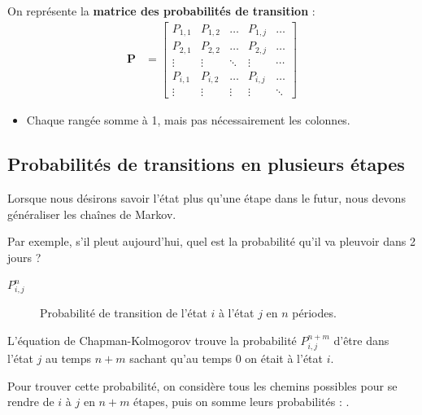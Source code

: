 \documentclass[french]{article}
\begin{document}
\begin{multicols*}{2}
On représente la \textbf{matrice des probabilités de transition}  : 
\begin{align*}
	\bm{P}
	&=	\begin{bmatrix}
		P_{1, 1}	&	P_{1, 2}	&	\dots	&	P_{1, j}		&	\dots	\\
		P_{2, 1}	&	P_{2, 2}	&	\dots	&	P_{2, j}		&	\dots	\\
		\vdots	&	\vdots	&	\ddots	&	\vdots		&	\cdots	\\
		P_{i, 1}	&	P_{i, 2}	&	\dots	&	P_{i, j}		&	\dots	\\
		\vdots	&	\vdots	&	\vdots	&	\vdots		&	\ddots	
		\end{bmatrix}
\end{align*}
\begin{itemize}
	\item	Chaque rangée somme à 1, mais pas nécessairement les colonnes.
\end{itemize}


\columnbreak
\subsection{Probabilités de transitions en plusieurs étapes}
\begin{rappel_enhanced}[Contexte]
Lorsque nous désirons savoir l'état plus qu'une étape dans le futur, nous devons généraliser les chaînes de Markov. 

\bigskip

Par exemple, s'il pleut aujourd'hui, quel est la probabilité qu'il va pleuvoir dans 2 jours ? 
\end{rappel_enhanced}

\begin{distributions}[Notation]
\begin{description}
	\item[$P_{i, j}^{n}$]	Probabilité de transition de l'état $i$ à l'état $j$ en $n$ périodes.
\end{description}
\end{distributions}

\begin{definitionNOHFILLprop}
L'équation de Chapman-Kolmogorov trouve la probabilité $P_{i, j}^{n + m}$ d'être dans l'état $j$ au temps $n + m$ sachant qu'au temps $0$ on était à l'état $i$.	

\bigskip

Pour trouver cette probabilité, on considère tous les chemins possibles pour se rendre de $i$ à $j$ en $n + m$ étapes, puis on somme leurs probabilités : .	


\end{definitionNOHFILLprop}
\end{multicols*}
\end{document}
